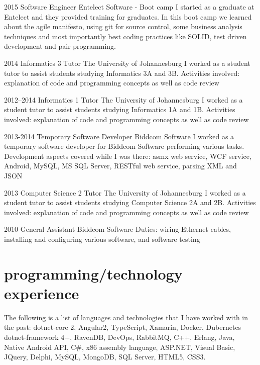\documentclass[]{friggeri-cv} %
\begin{document}
\begin{entrylist}
\entry
{2015} %
{Software Engineer}
{Entelect Software - Boot camp}
{I started as a graduate at Entelect and they provided training for graduates. In this boot camp we learned about the agile manifesto, using git for source control, some business analysis techniques and most importantly best coding practices like SOLID, test driven development and pair programming.}

\entry
{2014}
{Informatics 3 Tutor}
{The University of Johannesburg}
{I worked as a student tutor to assist students studying Informatics 3A and 3B. Activities involved: explanation of code and programming concepts as well as code review}

\entry
{2012--2014}
{Informatics 1 Tutor}
{The University of Johannesburg}
{I worked as a student tutor to assist students studying Informatics 1A and 1B.  Activities involved: explanation of code and programming concepts as well as code review}

\entry
{2013-2014} %
{Temporary Software Developer}
{Biddcom Software}
{I worked as a temporary software developer for Biddcom Software performing various tasks. Development aspects covered while I was there: asmx web service, WCF service, Android, MySQL, MS SQL Server, RESTful web service, parsing XML and JSON}

\entry
{2013}
{Computer Science 2 Tutor}
{The University of Johannesburg}
{I worked as a student tutor to assist students studying Computer Science 2A and 2B.  Activities involved: explanation of code and programming concepts as well as code review}

\entry
{2010} %
{General Assistant}
{Biddcom Software}
{Duties: wiring Ethernet cables, installing and configuring various software, and software testing}

\end{entrylist}


\section{programming/technology experience}

\begin{entrylist}
	
\entry
{}
{}
{}
{The following is a list of languages and technologies that I have worked with in the past: dotnet-core 2, Angular2, TypeScript, Xamarin, Docker, Dubernetes dotnet-framework 4+, RavenDB, DevOps, RabbitMQ, C++, Erlang, Java, Native Android API, C\#, x86 assembly language, ASP.NET, Visual Basic, JQuery, Delphi, MySQL, MongoDB, SQL Server, HTML5, CSS3.}
	
\end{entrylist}
\end{document}
